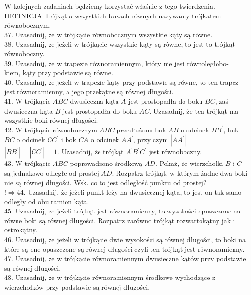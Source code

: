 \documentclass[10pt]{article}
\begin{document}
W kolejnych zadaniach będziemy korzystać właśnie z tego twierdzenia.\\
DEFINICJA Trójkąt o wszystkich bokach równych nazywamy trójkatem równobocznym.\\
37. Uzasadnij, że w trójkącie równobocznym wszystkie kąty są równe.\\
38. Uzasadnij, że jeżeli w trójkącie wszystkie kąty są równe, to jest to trójkąt równoboczny.\\
39. Uzasadnij, że w trapezie równoramiennym, który nie jest równoległobo- \(\qquad\) kiem, kąty przy podstawie są równe.\\
40. Uzasadnij, że jeżeli w trapezie kąty przy podstawie są równe, to ten trapez jest równoramienny, a jego przekątne są równej długości.\\
41. W trójkącie \(A B C\) dwusieczna kąta \(A\) jest prostopadła do boku \(B C\), zaś dwusieczna kąta \(B\) jest prostopadła do boku \(A C\). Uzasadnij, że ten trójkąt ma wszystkie boki równej długości.\\
42. W trójkącie równobocznym \(A B C\) przedłużono bok \(A B\) o odcinek \(B B^{\prime}\), bok \(B C\) o odcinek \(C C^{\prime}\) i bok \(C A\) o odcinek \(A A^{\prime}\), przy czym \(\left|A A^{\prime}\right|=\) \(\left|B B^{\prime}\right|=\left|C C^{\prime}\right|=1\). Uzasadnij, że trójkąt \(A^{\prime} B^{\prime} C^{\prime}\) jest równoboczny.\\
43. W trójkącie \(A B C\) poprowadzono środkową \(A D\). Pokaż, że wierzchołki \(B\) i \(C\) są jednakowo odległe od prostej \(A D\). Rozpatrz trójkąt, w którym żadne dwa boki nie są równej długości. Wsk. co to jest odległość punktu od prostej?\\
\(!\Rightarrow 44\). Uzasadnij, że jeżeli punkt leży na dwusiecznej kąta, to jest on tak samo odległy od obu ramion kąta.\\
45. Uzasadnij, że jeżeli trójkąt jest równoramienny, to wysokości opuszczone na równe boki są równej długości. Rozpatrz zarówno trójkąt rozwartokątny jak i ostrokątny.\\
46. Uzasadnij, że jeżeli w trójkącie dwie wysokości są równej długości, to boki na które są one opuszczone są równej długości czyli ten trójkąt jest równoramienny.\\
47. Uzasadnij, że w trójkącie równoramiennym dwusieczne kątów przy podstawie są równej długości.\\
48. Uzasadnij, że w trójkącie równoramiennym środkowe wychodzące z wierzchołków przy podstawie są równej długości.\\
\end{document}

